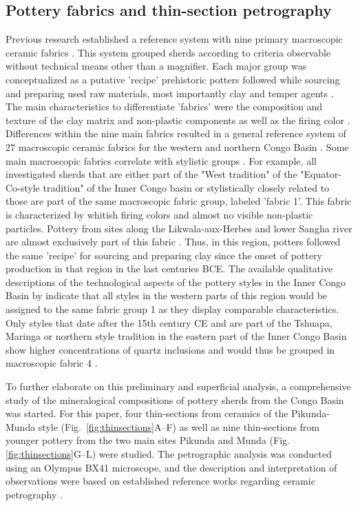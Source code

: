\documentclass[smallextended,natbib]{svjour3}       %
\begin{document}
\subsection{Pottery fabrics and thin-section petrography}

Previous research established a reference system with nine primary macroscopic ceramic fabrics \cite[60--69]{Seidensticker.2021e}. This system grouped sherds according to criteria observable without technical means other than a magnifier. Each major group was conceptualized as a putative 'recipe' prehistoric potters followed while sourcing and preparing used raw materials, most importantly clay and temper agents \citep[49]{Lange.2006}. The main characteristics to differentiate 'fabrics' \citep[cf.][38--51]{Riemer.2011} were the composition and texture of the clay matrix and non-plastic components as well as the firing color \citep[34]{Nordstrom.1972}. Differences within the nine main fabrics resulted in a general reference system of 27 macroscopic ceramic fabrics for the western and northern Congo Basin \citep[62--65 Tab.~11]{Seidensticker.2021e}. Some main macroscopic fabrics correlate with stylistic groups \cite[69 Tab.~12]{Seidensticker.2021e}. For example, all investigated sherds that are either part of the "West tradition" of the "Equator-Co-style tradition" of the Inner Congo basin \citep[221--222 Fig.~4]{Wotzka.1995} or stylistically closely related to those are part of the same macroscopic fabric group, labeled 'fabric 1'. This fabric is characterized by whitish firing colors and almost no visible non-plastic particles. Pottery from sites along the Likwala-aux-Herbes and lower Sangha river are almost exclusively part of this fabric \cite[67 Fig.~21]{Seidensticker.2021e}. Thus, in this region, potters followed the same 'recipe' for sourcing and preparing clay since the onset of pottery production in that region in the last centuries BCE. The available qualitative descriptions of the technological aspects of the pottery styles in the Inner Congo Basin by \citet[59--210]{Wotzka.1995} indicate that all styles in the western parts of this region would be assigned to the same fabric group 1 as they display comparable characteristics. Only styles that date after the 15th century CE and are part of the Tshuapa, Maringa or northern style tradition in the eastern part of the Inner Congo Basin show higher concentrations of quartz inclusions and would thus be grouped in macroscopic fabric 4 \citep[62--65 Tab.~11]{Seidensticker.2021e}.

To further elaborate on this preliminary and superficial analysis, a comprehensive study of the mineralogical compositions of pottery sherds from the Congo Basin was started. For this paper, four thin-sections from ceramics of the Pikunda-Munda style (Fig.~\ref{fig:thinsections}A--F) as well as nine thin-sections from younger pottery from the two main sites Pikunda and Munda (Fig.\ref{fig:thinsections}G--L) were studied. The petrographic analysis was conducted using an Olympus BX41 microscope, and the description and interpretation of observations were based on established reference works regarding ceramic petrography \citep{MacKenzie.2017,Quinn.2022}. 
\end{document}
